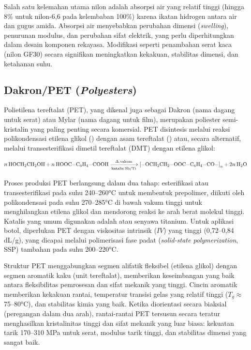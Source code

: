 \documentclass[12pt,a4paper,openany]{book}
\begin{document}
Salah satu kelemahan utama nilon adalah absorpsi air yang relatif tinggi (hingga 8\% untuk nilon-6,6 pada kelembaban 100\%) karena ikatan hidrogen antara air dan gugus amida. Absorpsi air menyebabkan perubahan dimensi (\textit{swelling}), penurunan modulus, dan perubahan sifat elektrik, yang perlu diperhitungkan dalam desain komponen rekayasa. Modifikasi seperti penambahan serat kaca (nilon GF30) secara signifikan meningkatkan kekakuan, stabilitas dimensi, dan ketahanan suhu.

\subsection{Dakron/PET (\textit{Polyesters})}
\label{subsec:dakron}

Polietilena tereftalat (PET), yang dikenal juga sebagai Dakron (nama dagang untuk serat) atau Mylar (nama dagang untuk film), merupakan poliester semi-kristalin yang paling penting secara komersial. PET disintesis melalui reaksi polikondensasi etilena glikol () dengan asam tereftalat () atau, secara alternatif, melalui transesterifikasi dimetil tereftalat (DMT) dengan etilena glikol:

\begin{equation}
n\:\ce{HOCH2CH2OH} + n\:\ce{HOOC-C6H4-COOH} \xrightarrow[\text{katalis Sb/Ti}]{\Delta, \text{vakum}} \ce{[-OCH2CH2-OOC-C6H4-CO-]}_n + 2n\:\ce{H2O}
\end{equation}

Proses produksi PET berlangsung dalam dua tahap: esterifikasi atau transesterifikasi pada suhu 240--260°C untuk membentuk prepolimer, diikuti oleh polikondensasi pada suhu 270--285°C di bawah vakum tinggi untuk menghilangkan etilena glikol dan mendorong reaksi ke arah berat molekul tinggi. Katalis yang umum digunakan adalah  atau senyawa titanium. Untuk aplikasi botol, diperlukan PET dengan viskositas intrinsik ($IV$) yang tinggi (0,72--0,84 dL/g), yang dicapai melalui polimerisasi fase padat (\textit{solid-state polymerization}, SSP) tambahan pada suhu 200--220°C.

Struktur PET menggabungkan segmen alifatik fleksibel (etilena glikol) dengan segmen aromatik kaku (unit tereftalat), memberikan keseimbangan yang baik antara fleksibilitas pemrosesan dan sifat mekanik yang tinggi. Cincin aromatik memberikan kekakuan rantai, temperatur transisi gelas yang relatif tinggi ($T_g \approx$ 75--80°C), dan stabilitas kimia yang baik. Ketika diorientasi secara biaksial (peregangan dalam dua arah), rantai-rantai PET tersusun secara teratur menghasilkan kristalinitas tinggi dan sifat mekanik yang luar biasa: kekuatan tarik 170--310 MPa untuk serat, modulus tarik tinggi, dan stabilitas dimensi yang sangat baik.
\end{document}
